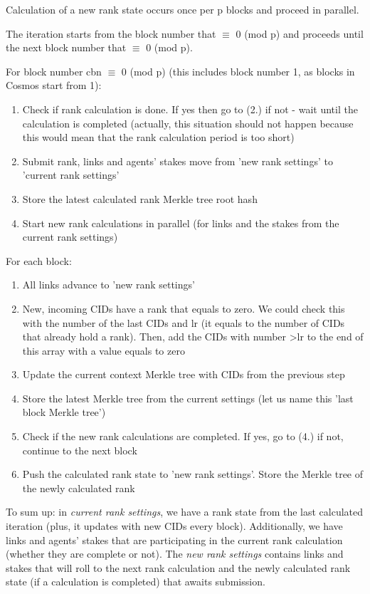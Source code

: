 \documentclass[8pt,oneside]{amsart}
\newcommand{\code}[1]{{\PlayBold #1}}
\begin{document}
\begin{Abstract}
Calculation of a new rank state occurs once per \code{p} blocks and proceed in parallel.

The iteration starts from the block number that \code{$\equiv$ 0 (mod p)} and proceeds until the next block number that \code{$\equiv$ 0 (mod p)}.

For block number \code{cbn $\equiv$ 0 (mod p)} (this includes block number 1, as blocks in Cosmos start from 1):

\begin{enumerate}
  \item Check if rank calculation is done. If yes then go to (2.) if not - wait until the calculation is completed
  (actually, this situation should not happen because this would mean that the rank calculation period is too short)
  \item Submit rank, links and agents' stakes move from 'new rank settings' to 'current rank settings'
  \item Store the latest calculated rank Merkle tree root hash
  \item Start new rank calculations in parallel (for links and the stakes from the current rank settings)
\end{enumerate}

For each block:

\begin{enumerate}
  \item All links advance to 'new rank settings'
  \item New, incoming CIDs have a rank that equals to zero. We could check this with the number of the last CIDs and \code{lr} (it equals to the number of CIDs that already hold a rank). Then, add the CIDs with number \code{>lr} to the end of this array with a value equals to zero
  \item Update the current context Merkle tree with CIDs from the previous step
  \item Store the latest Merkle tree from the current settings (let us name this 'last block Merkle tree')
  \item Check if the new rank calculations are completed. If yes, go to (4.) if not, continue to the next block
  \item Push the calculated rank state to 'new rank settings'. Store the Merkle tree of the newly calculated rank
\end{enumerate}
To sum up: in \textit{current rank settings}, we have a rank state from the last calculated iteration (plus, it updates with new CIDs every block). Additionally, we have links and agents' stakes that are participating in the current rank calculation (whether they are complete or not). The \textit{new rank settings} contains links and stakes that will roll to the next rank calculation and the newly calculated rank state (if a calculation is completed) that awaits submission.


\end{Abstract}
\end{document}
